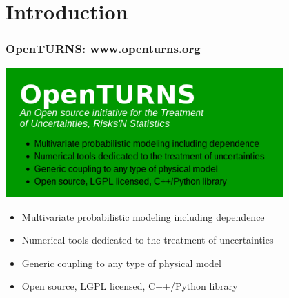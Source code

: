 \documentclass{beamer}
\begin{document}
\section{Introduction}


\begin{frame}
\frametitle{OpenTURNS: \url{www.openturns.org}}


    \begin{center}
    \includegraphics[width=0.8\textwidth]{figures/OT.png}
    \end{center}
	
\begin{itemize}
\item Multivariate probabilistic modeling including dependence
\item Numerical tools dedicated to the treatment of uncertainties
\item Generic coupling to any type of physical model
\item Open source, LGPL licensed, C++/Python library
\end{itemize}


\end{frame}

\end{document}
